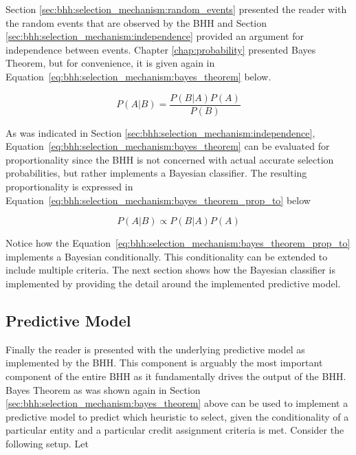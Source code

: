 Section \ref{sec:bhh:selection_mechanism:random_events} presented the reader with the random events that are observed by the \ac{BHH} and Section \ref{sec:bhh:selection_mechanism:independence} provided an argument for independence between events. Chapter \ref{chap:probability} presented Bayes Theorem, but for convenience, it is given again in Equation~\eqref{eq:bhh:selection_mechanism:bayes_theorem} below.

\begin{equation}
      \label{eq:bhh:selection_mechanism:bayes_theorem}
      P(A \vert B) = \frac{P(B \vert A)P(A)}{P(B)}
\end{equation}

As was indicated in Section \ref{sec:bhh:selection_mechanism:independence}, Equation~\eqref{eq:bhh:selection_mechanism:bayes_theorem} can be evaluated for proportionality since the \ac{BHH} is not concerned with actual accurate selection probabilities, but rather implements a Bayesian classifier. The resulting proportionality is expressed in Equation~\eqref{eq:bhh:selection_mechanism:bayes_theorem_prop_to} below

\begin{equation}
      \label{eq:bhh:selection_mechanism:bayes_theorem_prop_to}
      P(A \vert B) \propto P(B \vert A)P(A)
\end{equation}

Notice how the Equation~\eqref{eq:bhh:selection_mechanism:bayes_theorem_prop_to} implements a Bayesian conditionally. This conditionality can be extended to include multiple criteria. The next section shows how the Bayesian classifier is implemented by providing the detail around the implemented predictive model.


\subsection{Predictive Model}
\label{sec:bhh:selection_mechanism:predictive_model}

Finally the reader is presented with the underlying predictive model as implemented by the \ac{BHH}. This component is arguably the most important component of the entire \ac{BHH} as it fundamentally drives the output of the \ac{BHH}. Bayes Theorem as was shown again in Section \ref{sec:bhh:selection_mechanism:bayes_theorem} above can be used to implement a predictive model to predict which heuristic to select, given the conditionality of a particular entity and a particular credit assignment criteria is met. Consider the following setup. Let

